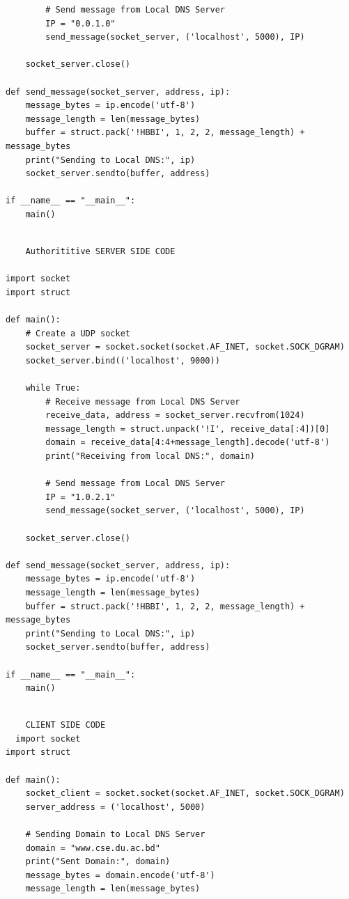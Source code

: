\documentclass[11pt]{article}
\begin{document}
\begin{itemize}
\begin{verbatim}
        # Send message from Local DNS Server
        IP = "0.0.1.0"
        send_message(socket_server, ('localhost', 5000), IP)

    socket_server.close()

def send_message(socket_server, address, ip):
    message_bytes = ip.encode('utf-8')
    message_length = len(message_bytes)
    buffer = struct.pack('!HBBI', 1, 2, 2, message_length) + message_bytes
    print("Sending to Local DNS:", ip)
    socket_server.sendto(buffer, address)

if __name__ == "__main__":
    main()


\end{verbatim}
\begin{verbatim}
    Authorititive SERVER SIDE CODE
    
import socket
import struct

def main():
    # Create a UDP socket
    socket_server = socket.socket(socket.AF_INET, socket.SOCK_DGRAM)
    socket_server.bind(('localhost', 9000))

    while True:
        # Receive message from Local DNS Server
        receive_data, address = socket_server.recvfrom(1024)
        message_length = struct.unpack('!I', receive_data[:4])[0]
        domain = receive_data[4:4+message_length].decode('utf-8')
        print("Receiving from local DNS:", domain)

        # Send message from Local DNS Server
        IP = "1.0.2.1"
        send_message(socket_server, ('localhost', 5000), IP)

    socket_server.close()

def send_message(socket_server, address, ip):
    message_bytes = ip.encode('utf-8')
    message_length = len(message_bytes)
    buffer = struct.pack('!HBBI', 1, 2, 2, message_length) + message_bytes
    print("Sending to Local DNS:", ip)
    socket_server.sendto(buffer, address)

if __name__ == "__main__":
    main()


\end{verbatim}
    \begin{verbatim}
    CLIENT SIDE CODE
  import socket
import struct

def main():
    socket_client = socket.socket(socket.AF_INET, socket.SOCK_DGRAM)
    server_address = ('localhost', 5000)

    # Sending Domain to Local DNS Server
    domain = "www.cse.du.ac.bd"
    print("Sent Domain:", domain)
    message_bytes = domain.encode('utf-8')
    message_length = len(message_bytes)


\end{verbatim}
\end{itemize}
\end{document}

